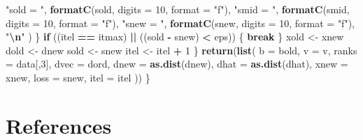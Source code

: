 \documentclass[
  12pt,
]{article}
\newenvironment{Shaded}{\begin{snugshade}}{\end{snugshade}}
\newcommand{\AttributeTok}[1]{\textcolor[rgb]{0.13,0.29,0.53}{#1}}
\newcommand{\ControlFlowTok}[1]{\textcolor[rgb]{0.13,0.29,0.53}{\textbf{#1}}}
\newcommand{\DecValTok}[1]{\textcolor[rgb]{0.00,0.00,0.81}{#1}}
\newcommand{\FunctionTok}[1]{\textcolor[rgb]{0.13,0.29,0.53}{\textbf{#1}}}
\newcommand{\NormalTok}[1]{#1}
\newcommand{\OtherTok}[1]{\textcolor[rgb]{0.56,0.35,0.01}{#1}}
\newcommand{\SpecialCharTok}[1]{\textcolor[rgb]{0.81,0.36,0.00}{\textbf{#1}}}
\newcommand{\StringTok}[1]{\textcolor[rgb]{0.31,0.60,0.02}{#1}}
\begin{document}
\begin{Shaded}
\begin{Highlighting}[]
          \StringTok{"sold = "}\NormalTok{,}
          \FunctionTok{formatC}\NormalTok{(sold, }\AttributeTok{digits =} \DecValTok{10}\NormalTok{, }\AttributeTok{format =} \StringTok{"f"}\NormalTok{),}
          \StringTok{"smid = "}\NormalTok{,}
          \FunctionTok{formatC}\NormalTok{(smid, }\AttributeTok{digits =} \DecValTok{10}\NormalTok{, }\AttributeTok{format =} \StringTok{"f"}\NormalTok{),}
          \StringTok{"snew = "}\NormalTok{,}
          \FunctionTok{formatC}\NormalTok{(snew, }\AttributeTok{digits =} \DecValTok{10}\NormalTok{, }\AttributeTok{format =} \StringTok{"f"}\NormalTok{),}
          \StringTok{"}\SpecialCharTok{\textbackslash{}n}\StringTok{"}
\NormalTok{        )}
\NormalTok{      \}}
      \ControlFlowTok{if}\NormalTok{ ((itel }\SpecialCharTok{==}\NormalTok{ itmax) }\SpecialCharTok{||}\NormalTok{ ((sold }\SpecialCharTok{{-}}\NormalTok{ snew) }\SpecialCharTok{\textless{}}\NormalTok{ eps)) \{}
        \ControlFlowTok{break}
\NormalTok{      \}}
\NormalTok{      xold }\OtherTok{\textless{}{-}}\NormalTok{ xnew}
\NormalTok{      dold }\OtherTok{\textless{}{-}}\NormalTok{ dnew}
\NormalTok{      sold }\OtherTok{\textless{}{-}}\NormalTok{ snew}
\NormalTok{      itel }\OtherTok{\textless{}{-}}\NormalTok{ itel }\SpecialCharTok{+} \DecValTok{1}
\NormalTok{    \}}
    \FunctionTok{return}\NormalTok{(}\FunctionTok{list}\NormalTok{(}
      \AttributeTok{b =}\NormalTok{ bold,}
      \AttributeTok{v =}\NormalTok{ v,}
      \AttributeTok{ranks =}\NormalTok{ data[,}\DecValTok{3}\NormalTok{],}
      \AttributeTok{dvec =}\NormalTok{ dord,}
      \AttributeTok{dnew =} \FunctionTok{as.dist}\NormalTok{(dnew),}
      \AttributeTok{dhat =} \FunctionTok{as.dist}\NormalTok{(dhat),}
      \AttributeTok{xnew =}\NormalTok{ xnew,}
      \AttributeTok{loss =}\NormalTok{ snew,}
      \AttributeTok{itel =}\NormalTok{ itel}
\NormalTok{    ))}
\NormalTok{  \}}
\end{Highlighting}
\end{Shaded}

\section*{References}\label{references}
\end{document}
